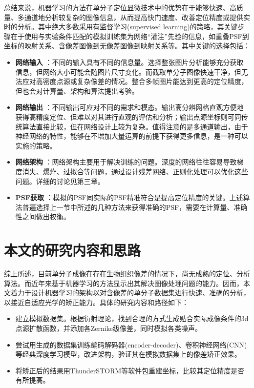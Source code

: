 \documentclass[draft=false,oneside]{fduthesis}
\begin{document}
    \par 总结来说，机器学习的方法在单分子定位显微技术中的优势在于能够快速、高质量、多通道地分析较复杂的图像信息，从而提高快门速度、改善定位精度或提供实时的分析。其中绝大多数采用有监督学习(supervised learning)的策略，其关键步骤在于使用与实验条件匹配的模拟训练集为网络“灌注”先验的信息，如重叠PSF到坐标的映射关系、含像差图像到无像差图像到映射关系等。其中关键的选择包括：

    \begin{itemize}
        \item[1.] \textbf{网络输入} ：不同的输入具有不同的信息量。选择整张图片分析能够充分获取信息，但网络大小可能会随图片尺寸变化。而截取单分子图像快速干净，但无法应对高密度点源或复杂像差的情况。整合多帧图片能达到更高的定位精度，但也会对计算量、架构和算法提出考验。
        \item[2.] \textbf{网络输出} ：不同输出可应对不同的需求和模态。输出高分辨网格直观方便地获得高精度定位、但难以对其进行直观的评估和分析；输出点源坐标则可同传统算法直接比较，但在网络设计上较为复杂。值得注意的是多通道输出，由于神经网络的特性，能够在不增加大量运算的前提下获得更多信息，是一种可以实施的策略。
        \item[3.] \textbf{网络架构} ：网络架构主要用于解决训练的问题。深度的网络往往容易导致梯度消失、爆炸、过拟合等问题，通过设计残差网络、正则化处理可以优化这些问题。详细的讨论见第三章。
        \item[4.] \textbf{PSF获取} ：模拟的PSF同实际的PSF精准符合是提高定位精度的关键。上述算法普遍选择上一节中所述的几种方法来获得准确的PSF，需要在计算量、准确性之间做出权衡。
    \end{itemize}
    
    \section{本文的研究内容和思路}

    综上所述，目前单分子成像在存在生物组织像差的情况下，尚无成熟的定位、分析算法。而近年来基于机器学习的方法显示出其解决图像处理问题的能力。因而，本文着力于设计机器学习的架构以对含像差的单分子数据集进行快速、准确的分析，以接近自适应光学的矫正能力。具体的研究内容和路径如下：

    \begin{itemize}
    \item[1.] 建立模拟数据集。根据衍射理论，找到合理的方式生成贴合实际成像条件的3d点源扩散函数，并添加各Zernike级像差，同时模拟各类噪声。
    \item[2.] 尝试用生成的数据集训练编码解码器(encoder-decoder)、卷积神经网络(CNN)等经典深度学习模型，改进架构，验证其在模拟数据集上的像差矫正效果。
    \item[3.] 将矫正后的结果用ThunderSTORM等软件包重建坐标，比较其定位精度是否有所提高。
    \end{itemize}
\end{document}
